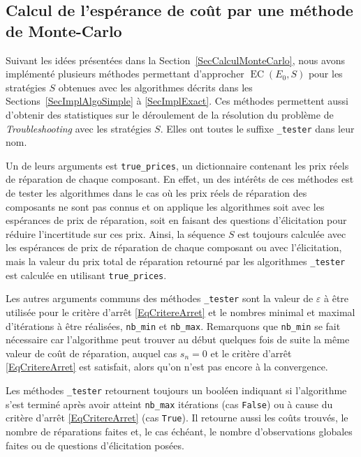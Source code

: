 \documentclass[a4paper,11pt]{article}
\theoremstyle{plain}
\theoremstyle{definition}
\DeclareMathOperator{\EC}{EC}
\begin{document}
\subsection{Calcul de l'espérance de coût par une méthode de Monte-Carlo}
\label{SecImplMC}

Suivant les idées présentées dans la Section~\ref{SecCalculMonteCarlo}, nous avons implémenté plusieurs méthodes permettant d'approcher $\EC(E_0, S)$ pour les stratégies $S$ obtenues avec les algorithmes décrits dans les Sections~\ref{SecImplAlgoSimple} à \ref{SecImplExact}. Ces méthodes permettent aussi d'obtenir des statistiques sur le déroulement de la résolution du problème de \emph{Troubleshooting} avec les stratégies $S$. Elles ont toutes le suffixe \texttt{\_tester} dans leur nom.

Un de leurs arguments est \texttt{true\_prices}, un dictionnaire contenant les prix réels de réparation de chaque composant. En effet, un des intérêts de ces méthodes est de tester les algorithmes dans le cas où les prix réels de réparation des composants ne sont pas connus et on applique les algorithmes soit avec les espérances de prix de réparation, soit en faisant des questions d'élicitation pour réduire l'incertitude sur ces prix. Ainsi, la séquence $S$ est toujours calculée avec les espérances de prix de réparation de chaque composant ou avec l'élicitation, mais la valeur du prix total de réparation retourné par les algorithmes \texttt{\_tester} est calculée en utilisant \texttt{true\_prices}.

Les autres arguments communs des méthodes \texttt{\_tester} sont la valeur de $\varepsilon$ à être utilisée pour le critère d'arrêt \eqref{EqCritereArret} et le nombres minimal et maximal d'itérations à être réalisées, \texttt{nb\_min} et \texttt{nb\_max}. Remarquons que \texttt{nb\_min} se fait nécessaire car l'algorithme peut trouver au début quelques fois de suite la même valeur de coût de réparation, auquel cas $s_n = 0$ et le critère d'arrêt \eqref{EqCritereArret} est satisfait, alors qu'on n'est pas encore à la convergence.

Les méthodes \texttt{\_tester} retournent toujours un booléen indiquant si l'algorithme s'est terminé après avoir atteint \texttt{nb\_max} itérations (cas \texttt{False}) ou à cause du critère d'arrêt \eqref{EqCritereArret} (cas \texttt{True}). Il retourne aussi les coûts trouvés, le nombre de réparations faites et, le cas échéant, le nombre d'observations globales faites ou de questions d'élicitation posées.
\end{document}
